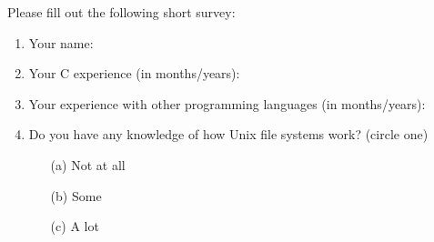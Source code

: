 \documentclass{article}
\title{}
\author{Debugging experiment - Entry Survey}
\date{July 30, 2003}
\begin{document}
\maketitle
\begin{flushleft}

\thispagestyle{empty}

\vspace{0.8in}

Please fill out the following short survey:

\begin{enumerate}
\item{Your name:}
\item{Your C experience (in months/years):}
\item{Your experience with other programming languages (in months/years):}
\item{Do you have any knowledge of how Unix file systems work? (circle one)
        \begin{itemize}
           \item[(a)] {Not at all}
           \item[(b)] {Some}
           \item[(c)] {A lot}
        \end{itemize} }
\end{enumerate}


\end{flushleft}
\end{document}
